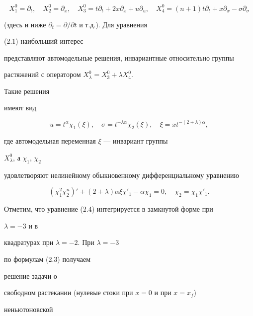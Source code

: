 \begin{equation}


X^0_1=\partial_t,\quad X^0_2=\partial_x,\quad


X^0_3=t\partial_t+2x\partial_x+u\partial_u,\quad


X^0_4=(n+1)t\partial_t+x\partial_x-\sigma\partial_\sigma \tag{2.2}


\end{equation}


(здесь и ниже $\partial_t=\partial/\partial t$ и т.д.). Для уравнения


(2.1) наибольший интерес


представляют автомодельные решения, инвариантные относительно группы


растяжений с оператором $X^0_\lambda=X^0_3+\lambda X^0_4$.


Такие решения


имеют вид


\begin{equation}


u=t^\alpha\chi_1(\xi),\quad


\sigma=t^{-\lambda\alpha}\chi_2(\xi),\quad


\xi=xt^{-(2+\lambda)\alpha}, \tag{2.3}


\end{equation}


где автомодельная переменная $\xi$ --- инвариант группы


$X^0_\lambda$, а $\chi_1$, $\chi_2$


удовлетворяют нелинейному обыкновенному дифференциальному уравнению


\begin{equation}


(\chi^2_1 \chi^n_2)'+(2+\lambda)\alpha\xi\chi'_1-


\alpha\chi_1=0,\quad \chi_2=\chi_1\chi'_1.\tag{2.4}


\end{equation}


Отметим, что уравнение (2.4) интегрируется в замкнутой форме при


$\lambda=-3$ и в


квадратурах при $\lambda=-2$. При $\lambda=-3$


по формулам (2.3) получаем


решение задачи о


свободном растекании (нулевые стоки при $x=0$ и при $x=x_f$)


неньютоновской


